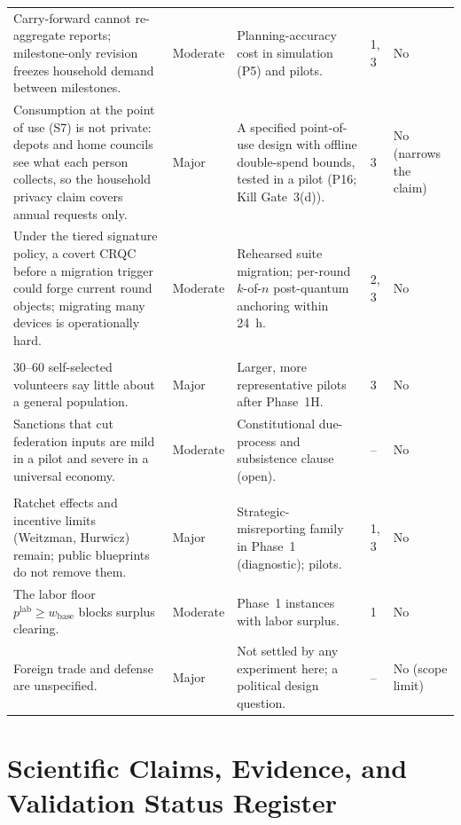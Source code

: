 \documentclass[10pt,twoside,openany]{book}
\theoremstyle{dpepstyle}
\begin{document}
{\begin{longtable}{L{1.45in} L{0.48in} L{1.55in} L{0.42in} L{0.42in}}
Carry-forward cannot re-aggregate reports; milestone-only revision freezes household demand between milestones. & Moderate & Planning-accuracy cost in simulation (P5) and pilots. & 1, 3 & No \\
Consumption at the point of use (S7) is not private: depots and home councils see what each person collects, so the household privacy claim covers annual requests only. & Major & A specified point-of-use design with offline double-spend bounds, tested in a pilot (P16; Kill Gate~3(d)). & 3 & No (narrows the claim) \\
Under the tiered signature policy, a covert CRQC before a migration trigger could forge current round objects; migrating many devices is operationally hard. & Moderate & Rehearsed suite migration; per-round $k$-of-$n$ post-quantum anchoring within 24~h. & 2, 3 & No \\
\addlinespace[2pt]
\\
30--60 self-selected volunteers say little about a general population. & Major & Larger, more representative pilots after Phase~1H. & 3 & No \\
Sanctions that cut federation inputs are mild in a pilot and severe in a universal economy. & Moderate & Constitutional due-process and subsistence clause (open). & -- & No \\
\addlinespace[2pt]
\\
Ratchet effects and incentive limits (Weitzman, Hurwicz) remain; public blueprints do not remove them. & Major & Strategic-misreporting family in Phase~1 (diagnostic); pilots. & 1, 3 & No \\
The labor floor $p^{\text{lab}}\ge w_{\text{base}}$ blocks surplus clearing. & Moderate & Phase~1 instances with labor surplus. & 1 & No \\
Foreign trade and defense are unspecified. & Major & Not settled by any experiment here; a political design question. & -- & No (scope limit) \\
\end{longtable}}

\appendix
\chapter{Scientific Claims, Evidence, and Validation Status Register}
\label{app:claims}
\end{document}
